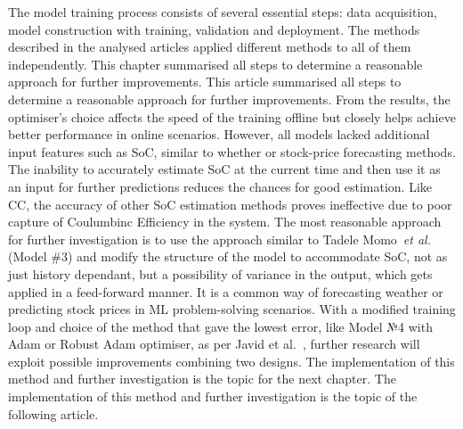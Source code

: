 %
%
The model training process consists of several essential steps: data acquisition, model construction with training, validation and deployment.
The methods described in the analysed articles applied different methods to all of them independently.
 {
    This chapter summarised all steps to determine a reasonable approach for further improvements.
} {
    This article summarised all steps to determine a reasonable approach for further improvements.
}
From the results, the optimiser's choice affects the speed of the training offline but closely helps achieve better performance in online scenarios.
However, all models lacked additional input features such as SoC, similar to whether or stock-price forecasting methods.
The inability to accurately estimate SoC at the current time and then use it as an input for further predictions reduces the chances for good estimation.
Like CC, the accuracy of other SoC estimation methods proves ineffective due to poor capture of Coulumbinc Efficiency in the system.
The most reasonable approach for further investigation is to use the approach similar to Tadele Momo~\textit{et al.}\cite{mamo_long_2020} (Model \#3) and modify the structure of the model to accommodate SoC, not as just history dependant, but a possibility of variance in the output, which gets applied in a feed-forward manner. 
It is a common way of forecasting weather or predicting stock prices in ML problem-solving scenarios.
With a modified training loop and choice of the method that gave the lowest error, like Model №4 with Adam or Robust Adam optimiser, as per Javid et al.~\cite{javid_adaptive_2020}, further research will exploit possible improvements combining two designs.
 {
    The implementation of this method and further investigation is the topic for the next chapter.
} {
    The implementation of this method and further investigation is the topic of the following article.
}